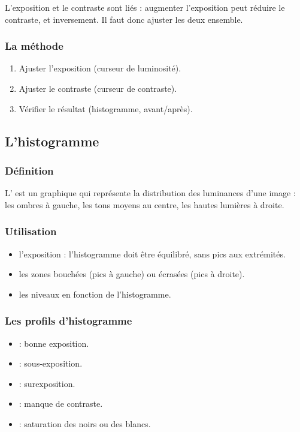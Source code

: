 L'exposition et le contraste sont liés : augmenter l'exposition peut réduire le contraste, et inversement. Il faut donc ajuster les deux ensemble.

\subsubsection{La méthode}

\begin{enumerate}
    \item Ajuster l'exposition (curseur de luminosité).
    \item Ajuster le contraste (curseur de contraste).
    \item Vérifier le résultat (histogramme, avant/après).
\end{enumerate}

\subsection{L'histogramme}

\subsubsection{Définition}

L' est un graphique qui représente la distribution des luminances d'une image : les ombres à gauche, les tons moyens au centre, les hautes lumières à droite.

\subsubsection{Utilisation}

\begin{itemize}
    \item {} l'exposition : l'histogramme doit être équilibré, sans pics aux extrémités.
    \item {} les zones bouchées (pics à gauche) ou écrasées (pics à droite).
    \item {} les niveaux en fonction de l'histogramme.
\end{itemize}

\subsubsection{Les profils d'histogramme}

\begin{itemize}
    \item {} : bonne exposition.
    \item {} : sous-exposition.
    \item {} : surexposition.
    \item {} : manque de contraste.
    \item {} : saturation des noirs ou des blancs.
\end{itemize}

